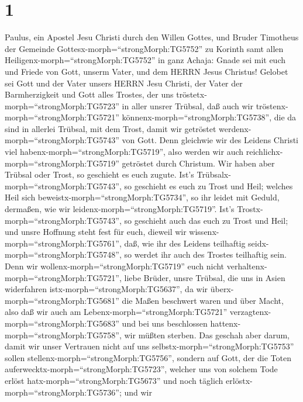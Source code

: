 \hypertarget{section}{%
\section{1}\label{section}}

 Paulus, ein Apostel Jesu Christi durch den Willen Gottes,
und Bruder Timotheus der Gemeinde Gottesx-morph=``strongMorph:TG5752''
zu Korinth samt allen Heiligenx-morph=``strongMorph:TG5752'' in ganz
Achaja:  Gnade sei mit euch und Friede von Gott, unserm
Vater, und dem HERRN Jesus Christus!  Gelobet sei Gott und
der Vater unsers HERRN Jesu Christi, der Vater der Barmherzigkeit und
Gott alles Trostes,  der uns
tröstetx-morph=``strongMorph:TG5723'' in aller unsrer Trübsal, daß auch
wir tröstenx-morph=``strongMorph:TG5721''
könnenx-morph=``strongMorph:TG5738'', die da sind in allerlei Trübsal,
mit dem Trost, damit wir getröstet werdenx-morph=``strongMorph:TG5743''
von Gott.  Denn gleichwie wir des Leidens Christi viel
habenx-morph=``strongMorph:TG5719'', also werden wir auch
reichlichx-morph=``strongMorph:TG5719'' getröstet durch Christum.
 Wir haben aber Trübsal oder Trost, so geschieht es euch
zugute. Ist's Trübsalx-morph=``strongMorph:TG5743'', so geschieht es
euch zu Trost und Heil; welches Heil sich
beweistx-morph=``strongMorph:TG5734'', so ihr leidet mit Geduld,
dermaßen, wie wir leidenx-morph=``strongMorph:TG5719''. Ist's
Trostx-morph=``strongMorph:TG5743'', so geschieht auch das euch zu Trost
und Heil;  und unsre Hoffnung steht fest für euch, dieweil
wir wissenx-morph=``strongMorph:TG5761'', daß, wie ihr des Leidens
teilhaftig seidx-morph=``strongMorph:TG5748'', so werdet ihr auch des
Trostes teilhaftig sein.  Denn wir
wollenx-morph=``strongMorph:TG5719'' euch nicht
verhaltenx-morph=``strongMorph:TG5721'', liebe Brüder, unsre Trübsal,
die uns in Asien widerfahren istx-morph=``strongMorph:TG5637'', da wir
überx-morph=``strongMorph:TG5681'' die Maßen beschwert waren und über
Macht, also daß wir auch am Lebenx-morph=``strongMorph:TG5721''
verzagtenx-morph=``strongMorph:TG5683''  und bei uns
beschlossen hattenx-morph=``strongMorph:TG5758'', wir müßten sterben.
Das geschah aber darum, damit wir unser Vertrauen nicht auf uns
selbstx-morph=``strongMorph:TG5753'' sollen
stellenx-morph=``strongMorph:TG5756'', sondern auf Gott, der die Toten
auferwecktx-morph=``strongMorph:TG5723'',  welcher uns von
solchem Tode erlöst hatx-morph=``strongMorph:TG5673'' und noch täglich
erlöstx-morph=``strongMorph:TG5736''; und wir
